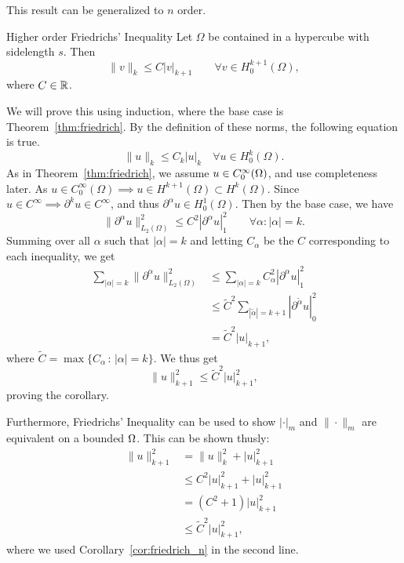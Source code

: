 This result can be generalized to $n$ order. 

\begin{kor}{Higher order Friedrichs' Inequality}
    Let $\Omega$ be contained in a hypercube with sidelength $s$. Then 
\begin{equation*}
    \| v \|_{k} \leq C |v|_{k+1} \quad \quad \forall v \in H_0^{k+1}(\Omega),
\end{equation*}
where $C\in \mathbb{R}$.~\label{cor:friedrich_n}
\end{kor}
\begin{bev}
We will prove this using induction, where the base case is Theorem~\ref{thm:friedrich}.
By the definition of these norms, the following equation is true.
\begin{equation*}
    \|u\|_{k } \leq C_k |u|_k \quad \forall u \in H_0^k (\Omega). 
\end{equation*}
As in Theorem~\ref{thm:friedrich}, we assume $u \in C^\infty_0(\Omega)$, and use completeness later.
As $u\in C^{\infty}_0(\Omega)\implies u \in H^{k+1}(\Omega)\subset H^k(\Omega)$. 
Since $u \in C^{\infty} \implies \partial^k u\in C^{\infty}$, 
and thus $\partial^\alpha u \in H^1_0(\Omega)$. Then by the base case, we have
\begin{equation*}
    \|\partial^\alpha u\|^2_{L_2(\Omega)} \leq C^2 |\partial^\alpha u|_1^2 \quad\quad \forall \alpha : |\alpha|=k.
\end{equation*}
Summing over all $\alpha$ such that $|\alpha| = k$ and letting $C_\alpha$ be the $C$ corresponding to each inequality, we get
\begin{equation}
    \begin{split}
        \sum_{|\alpha|=k} \|\partial^\alpha u\|^2_{L_2(\Omega)} &\leq \sum_{|\alpha|=k} C_\alpha^2 |\partial^\alpha u|_1^2 \\
        &\leq  \tilde{C}^2 \sum_{|\tilde{\alpha}|=k+1} |\partial^{\tilde{\alpha}} u |^2_0 \\
        &= \tilde{C}^2 |u|_{k+1},
    \end{split}
\end{equation}  
where $\tilde{C} = \max\{C_\alpha \,:\, |\alpha| = k\}$.
We thus get
\begin{equation}
    \|u\|^2_{k+1} \leq \tilde{C}^2 |u|^2_{k+1},
\end{equation}
proving the corollary.
\end{bev}
Furthermore, Friedrichs' Inequality can be used to show $|\cdot|_m$ and $\| \cdot\|_m$ are equivalent on a bounded 
$\Omega$. 
This can be shown thusly:
\begin{align*}
    \|u\|^2_{k+1} &=\|u\|^2_{k} + |u|^2_{k+1} \\
    &\leq C^2|u|^2_{k+1} + |u|^2_{k+1} \\
    &= (C^2 + 1)|u|^2_{k+1} \\
    &\leq \tilde{C}^2 |u|^2_{k+1},
\end{align*}
where we used Corollary~\ref{cor:friedrich_n} in the second line.
